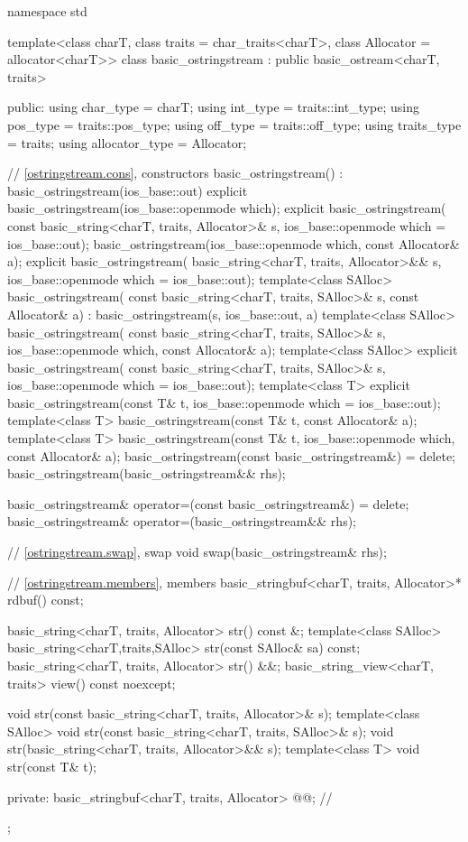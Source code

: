 %
\begin{codeblock}
namespace std {
  template<class charT, class traits = char_traits<charT>, class Allocator = allocator<charT>>
  class basic_ostringstream : public basic_ostream<charT, traits> {
  public:
    using char_type      = charT;
    using int_type       = traits::int_type;
    using pos_type       = traits::pos_type;
    using off_type       = traits::off_type;
    using traits_type    = traits;
    using allocator_type = Allocator;

    // \ref{ostringstream.cons}, constructors
    basic_ostringstream() : basic_ostringstream(ios_base::out) {}
    explicit basic_ostringstream(ios_base::openmode which);
    explicit basic_ostringstream(
      const basic_string<charT, traits, Allocator>& s,
      ios_base::openmode which = ios_base::out);
    basic_ostringstream(ios_base::openmode which, const Allocator& a);
    explicit basic_ostringstream(
      basic_string<charT, traits, Allocator>&& s,
      ios_base::openmode which = ios_base::out);
    template<class SAlloc>
      basic_ostringstream(
        const basic_string<charT, traits, SAlloc>& s, const Allocator& a)
        : basic_ostringstream(s, ios_base::out, a) {}
    template<class SAlloc>
      basic_ostringstream(
        const basic_string<charT, traits, SAlloc>& s,
        ios_base::openmode which, const Allocator& a);
    template<class SAlloc>
      explicit basic_ostringstream(
        const basic_string<charT, traits, SAlloc>& s,
        ios_base::openmode which = ios_base::out);
    template<class T>
      explicit basic_ostringstream(const T& t, ios_base::openmode which = ios_base::out);
    template<class T>
      basic_ostringstream(const T& t, const Allocator& a);
    template<class T>
      basic_ostringstream(const T& t, ios_base::openmode which, const Allocator& a);
    basic_ostringstream(const basic_ostringstream&) = delete;
    basic_ostringstream(basic_ostringstream&& rhs);

    basic_ostringstream& operator=(const basic_ostringstream&) = delete;
    basic_ostringstream& operator=(basic_ostringstream&& rhs);

    // \ref{ostringstream.swap}, swap
    void swap(basic_ostringstream& rhs);

    // \ref{ostringstream.members}, members
    basic_stringbuf<charT, traits, Allocator>* rdbuf() const;

    basic_string<charT, traits, Allocator> str() const &;
    template<class SAlloc>
      basic_string<charT,traits,SAlloc> str(const SAlloc& sa) const;
    basic_string<charT, traits, Allocator> str() &&;
    basic_string_view<charT, traits> view() const noexcept;

    void str(const basic_string<charT, traits, Allocator>& s);
    template<class SAlloc>
      void str(const basic_string<charT, traits, SAlloc>& s);
    void str(basic_string<charT, traits, Allocator>&& s);
    template<class T>
      void str(const T& t);

  private:
    basic_stringbuf<charT, traits, Allocator> @@;   // \expos
  };
}
\end{codeblock}


